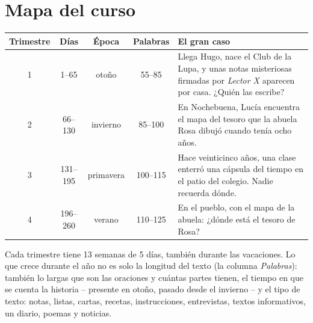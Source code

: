 \section*{Mapa del curso}

\begin{center}
\renewcommand{\arraystretch}{1.4}
\begin{tabularx}{\linewidth}{@{}c c c c X@{}}
\toprule
\textbf{Trimestre} & \textbf{Días} & \textbf{Época} & \textbf{Palabras} & \textbf{El gran caso} \\
\midrule
1 & 1--65   & otoño & 55--85 & Llega Hugo, nace el Club de la Lupa, y unas
notas misteriosas firmadas por \textit{Lector X} aparecen por casa.
¿Quién las escribe? \\
2 & 66--130 & invierno & 85--100 & En Nochebuena, Lucía encuentra el mapa
del tesoro que la abuela Rosa dibujó cuando tenía ocho años. \\
3 & 131--195 & primavera & 100--115 & Hace veinticinco años, una clase
enterró una cápsula del tiempo en el patio del colegio. Nadie recuerda
dónde. \\
4 & 196--260 & verano & 110--125 & En el pueblo, con el mapa de la
abuela: ¿dónde está el tesoro de Rosa? \\
\bottomrule
\end{tabularx}
\end{center}

\vspace{6mm}
Cada trimestre tiene 13 semanas de 5 días, también durante las
vacaciones. Lo que crece durante el año no es solo la longitud del texto
(la columna \textit{Palabras}): también lo largas que son las oraciones
y cuántas partes tienen, el tiempo en que se cuenta la historia --
presente en otoño, pasado desde el invierno -- y el tipo de texto:
notas, listas, cartas, recetas, instrucciones, entrevistas, textos
informativos, un diario, poemas y noticias.
\newpage

